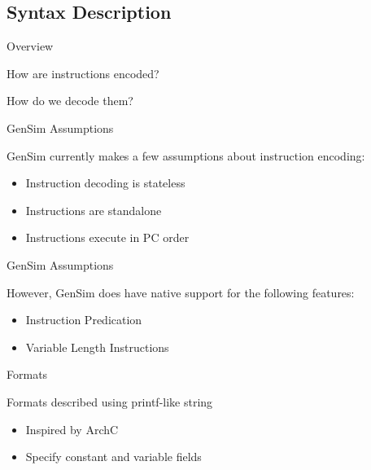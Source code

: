 \subsection{Syntax Description}

\begin{frame}{Overview}

How are instructions encoded?

How do we decode them?

\end{frame}

\begin{frame}{GenSim Assumptions}

GenSim currently makes a few assumptions about instruction encoding:
\begin{itemize}
\item Instruction decoding is stateless
\item Instructions are standalone
\item Instructions execute in PC order
\end{itemize}

\end{frame}

\begin{frame}{GenSim Assumptions}

However, GenSim does have native support for the following features:
\begin{itemize}
\item Instruction Predication
\item Variable Length Instructions
\end{itemize}

\end{frame}


\begin{frame}{Formats}

Formats described using printf-like string
\begin{itemize}
\item Inspired by ArchC
\item Specify constant and variable fields
\end{itemize}

\end{frame}

